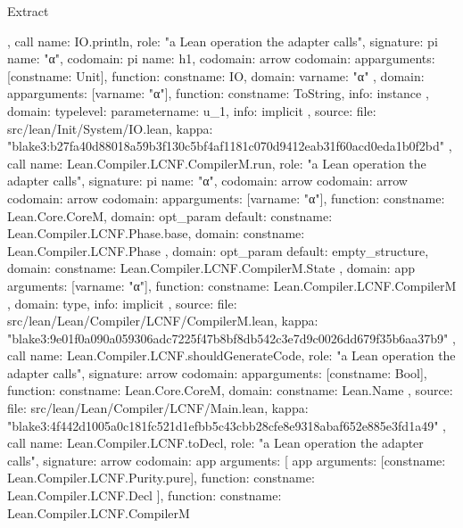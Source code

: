 \begin{lexlean}{Extract}
\begin{toolingmodule}
{{{      }
    },
    call{
      name: IO.println,
      role: "a Lean operation the adapter calls",
      signature: pi{
        name: "α",
        codomain: pi{
          name: h1,
          codomain: arrow{
            codomain: app{arguments: [const{name: Unit}], function: const{name: IO}},
            domain: var{name: "α"}
          },
          domain: app{arguments: [var{name: "α"}], function: const{name: ToString}},
          info: instance
        },
        domain: type{level: parameter{name: u_1}},
        info: implicit
      },
      source: {
        file: src/lean/Init/System/IO.lean,
        kappa: "blake3:b27fa40d88018a59b3f130c5bf4af1181c070d9412eab31f60acd0eda1b0f2bd"
      }
    },
    call{
      name: Lean.Compiler.LCNF.CompilerM.run,
      role: "a Lean operation the adapter calls",
      signature: pi{
        name: "α",
        codomain: arrow{
          codomain: arrow{
            codomain: arrow{
              codomain: app{arguments: [var{name: "α"}], function: const{name: Lean.Core.CoreM}},
              domain: opt_param{
                default: const{name: Lean.Compiler.LCNF.Phase.base},
                domain: const{name: Lean.Compiler.LCNF.Phase}
              }
            },
            domain: opt_param{
              default: empty_structure{},
              domain: const{name: Lean.Compiler.LCNF.CompilerM.State}
            }
          },
          domain: app{
            arguments: [var{name: "α"}],
            function: const{name: Lean.Compiler.LCNF.CompilerM}
          }
        },
        domain: type{},
        info: implicit
      },
      source: {
        file: src/lean/Lean/Compiler/LCNF/CompilerM.lean,
        kappa: "blake3:9e01f0a090a059306adc7225f47b8bf8db542c3e7d9c0026dd679f35b6aa37b9"
      }
    },
    call{
      name: Lean.Compiler.LCNF.shouldGenerateCode,
      role: "a Lean operation the adapter calls",
      signature: arrow{
        codomain: app{arguments: [const{name: Bool}], function: const{name: Lean.Core.CoreM}},
        domain: const{name: Lean.Name}
      },
      source: {
        file: src/lean/Lean/Compiler/LCNF/Main.lean,
        kappa: "blake3:4f442d1005a0c181fc521d1efbb5c43cbb28cfe8e9318abaf652e885e3fd1a49"
      }
    },
    call{
      name: Lean.Compiler.LCNF.toDecl,
      role: "a Lean operation the adapter calls",
      signature: arrow{
        codomain: app{
          arguments: [
            app{
              arguments: [const{name: Lean.Compiler.LCNF.Purity.pure}],
              function: const{name: Lean.Compiler.LCNF.Decl}
            }
          ],
          function: const{name: Lean.Compiler.LCNF.CompilerM}
}}}}
\end{toolingmodule}
\end{lexlean}
